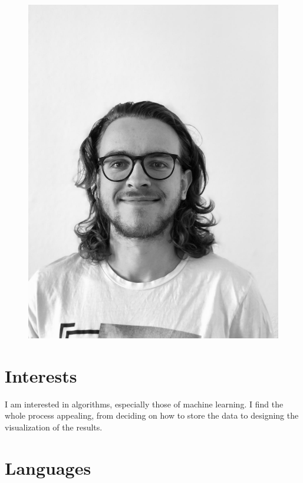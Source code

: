 \documentclass[]{commands}
\begin{document}
\begin{aside}
    ~

\vspace{-3.5cm}
\begin{figure}[ht]
	\hspace{0.3cm}
	\includegraphics[width=.71\linewidth]{img/portrait.jpg}
\end{figure}

\vspace{3.5mm}
\section{Interests}
\vspace{3.5mm}

I am interested in algorithms, especially those of machine learning. I find the whole process appealing, from deciding on how to store the data to designing the visualization of the results.


\vspace{3.5mm}
\section{Languages}
\vspace{3.5mm}


\end{aside}
\end{document}
